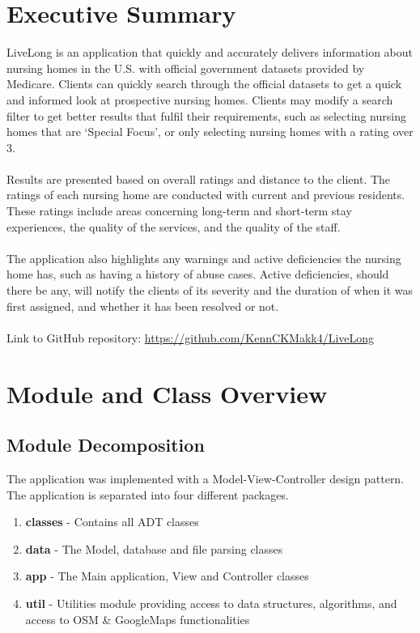 \documentclass[12pt]{article}
\begin{document}
\newpage
\section{Executive Summary}
LiveLong is an application that quickly and accurately delivers information about nursing homes in the U.S. with official government datasets provided by Medicare. Clients can quickly search through the official datasets to get a quick and informed look at prospective nursing homes. Clients may modify a search filter to get better results that fulfil their requirements, such as selecting nursing homes that are ‘Special Focus’, or only selecting nursing homes with a rating over 3. \\ \\
Results are presented based on overall ratings and distance to the client. The ratings of each nursing home are conducted with current and previous residents. These ratings include areas concerning long-term and short-term stay experiences, the quality of the services, and the quality of the staff.
\\ \\
The application also highlights any warnings and active deficiencies the nursing home has, such as having a history of abuse cases. Active deficiencies, should there be any, will notify the clients of its severity and the duration of when it was first assigned, and whether it has been resolved or not.\\ \\
Link to GitHub repository: \url{https://github.com/KennCKMakk4/LiveLong}
\newpage
\section{Module and Class Overview}

\subsection{Module Decomposition}

The application was implemented with a Model-View-Controller design pattern. The application is separated into four different packages.
\begin{enumerate}
\item \textbf{classes} - Contains all ADT classes
\item \textbf{data} - The Model, database and file parsing classes
\item \textbf{app} - The Main application, View and Controller classes
\item \textbf{util} - Utilities module providing access to data structures, algorithms, and access to OSM \& GoogleMaps functionalities
\end{enumerate}
\end{document}
